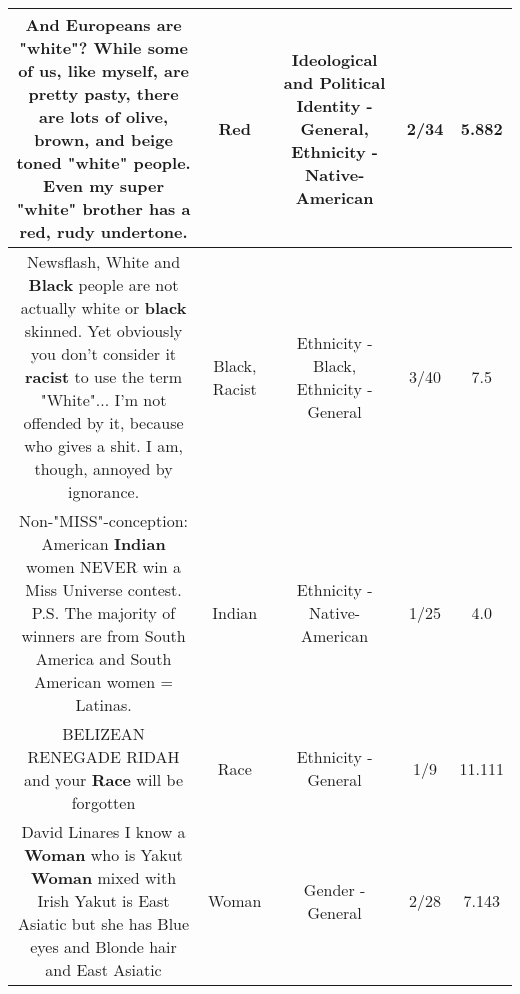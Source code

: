 \documentclass[11pt]{article}
\newlength\mylength
\begin{document}
\begin{center}
\begin{longtable}{|C{.65\mylength}|C{.30\mylength}|C{.12\mylength}|C{.12\mylength}|C{.12\mylength}|}
  \small And Europeans are "white"?  While some of us, like myself, are pretty pasty, there are lots of olive, brown, and beige toned "white" people.  Even my super "white" brother has a \textbf{r\textbf{ed}}, rudy  undertone.\normalsize   & Red &  Ideological and Political Identity - General, Ethnicity - Native-American & 2/34 & 5.882 \\  \hline
  \small Newsflash, White and \textbf{Black} people are not actually white or \textbf{black} skinned. Yet obviously you don't consider it \textbf{racist} to use the term "White"... I'm not offended by it, because who gives a shit. I am, though, annoyed by ignorance.\normalsize   & Black, Racist & Ethnicity - Black, Ethnicity - General & 3/40 & 7.5 \\  \hline
  \small Non-"MISS"-conception: American \textbf{Indian} women NEVER win a Miss Universe contest. P.S. The majority of winners are from South America and South American women = Latinas.\normalsize   & Indian & Ethnicity - Native-American & 1/25 & 4.0 \\  \hline
  \small BELIZEAN RENEGADE RIDAH and your \textbf{Race} will be forgotten\normalsize   & Race & Ethnicity - General & 1/9 & 11.111 \\  \hline
  \small David Linares I know a \textbf{Woman} who is Yakut \textbf{Woman} mixed with Irish Yakut is East Asiatic but she has Blue eyes and Blonde hair and East Asiatic\normalsize   & Woman & Gender - General & 2/28 & 7.143 \\  \hline

\end{longtable}
\end{center}
\end{document}
